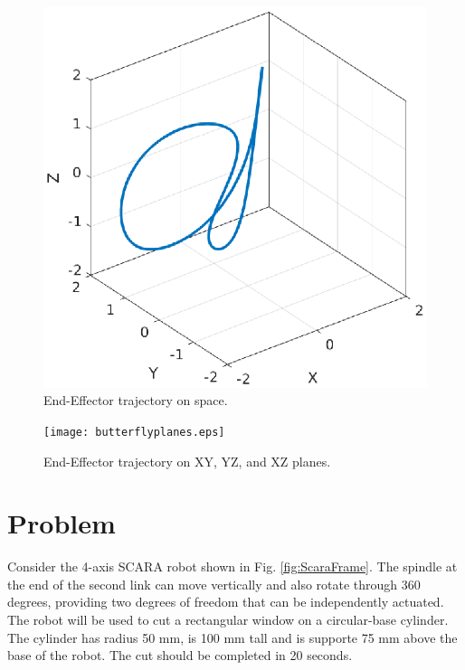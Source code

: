 \documentclass[a4paper,10pt]{article}
\begin{document}
\begin{figure}[H] 
 \centering
 \includegraphics[width=1\linewidth]{EndETraj3D.eps}
 \caption{End-Effector trajectory on space.}\label{fig:effec3D}
\end{figure}

\begin{figure}[H] 
 \centering
 \texttt{[image: butterflyplanes.eps]}
 \caption{End-Effector trajectory on XY, YZ, and XZ planes.}\label{fig:butterflyplanes}
\end{figure}


\section{Problem}

Consider the 4-axis SCARA robot shown in Fig. \ref{fig:ScaraFrame}. The spindle at the end of the second link can move vertically and also rotate through 360 degrees, providing two degrees of freedom that can be independently actuated. The robot will be used to cut a rectangular window on a circular-base cylinder. The cylinder has radius 50 mm, is 100 mm tall and is supporte 75 mm above the base of the robot. The cut should be completed in 20 seconds.

\hfill \break
\end{document}
